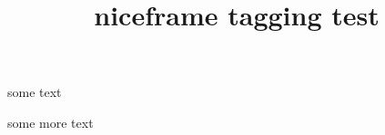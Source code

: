 \documentclass{article}
\title{niceframe tagging test}
\begin{document}
some text

some more text


\artdecoframe{\kant[1-2]}
\end{document}
